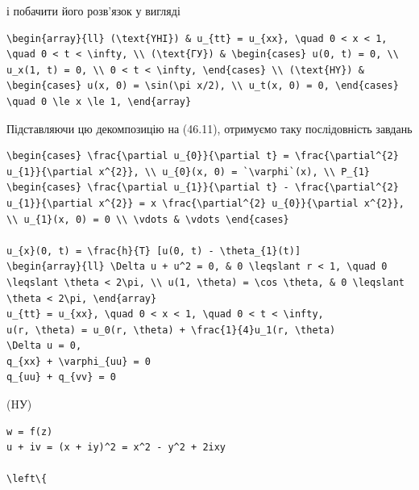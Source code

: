\documentclass[
  ukrainian,
]{article}
\begin{document}
і побачити його розв'язок у вигляді

\begin{verbatim}
\begin{array}{ll} (\text{YHI}) & u_{tt} = u_{xx}, \quad 0 < x < 1, \quad 0 < t < \infty, \\ (\text{ГУ}) & \begin{cases} u(0, t) = 0, \\ u_x(1, t) = 0, \\ 0 < t < \infty, \end{cases} \\ (\text{HY}) & \begin{cases} u(x, 0) = \sin(\pi x/2), \\ u_t(x, 0) = 0, \end{cases} \quad 0 \le x \le 1, \end{array}
\end{verbatim}

Підставляючи цю декомпозицію на (46.11), отримуємо таку послідовність
завдань

\begin{verbatim}
\begin{cases} \frac{\partial u_{0}}{\partial t} = \frac{\partial^{2} u_{1}}{\partial x^{2}}, \\ u_{0}(x, 0) = `\varphi`(x), \\ P_{1} \begin{cases} \frac{\partial u_{1}}{\partial t} - \frac{\partial^{2} u_{1}}{\partial x^{2}} = x \frac{\partial^{2} u_{0}}{\partial x^{2}}, \\ u_{1}(x, 0) = 0 \\ \vdots & \vdots \end{cases}

u_{x}(0, t) = \frac{h}{T} [u(0, t) - \theta_{1}(t)]
\begin{array}{ll} \Delta u + u^2 = 0, & 0 \leqslant r < 1, \quad 0 \leqslant \theta < 2\pi, \\ u(1, \theta) = \cos \theta, & 0 \leqslant \theta < 2\pi, \end{array}
u_{tt} = u_{xx}, \quad 0 < x < 1, \quad 0 < t < \infty,
u(r, \theta) = u_0(r, \theta) + \frac{1}{4}u_1(r, \theta)
\Delta u = 0,
q_{xx} + \varphi_{uu} = 0
q_{uu} + q_{vv} = 0
\end{verbatim}

(HУ)

\begin{verbatim}
w = f(z)
u + iv = (x + iy)^2 = x^2 - y^2 + 2ixy

\left\{
\end{verbatim}
\end{document}
